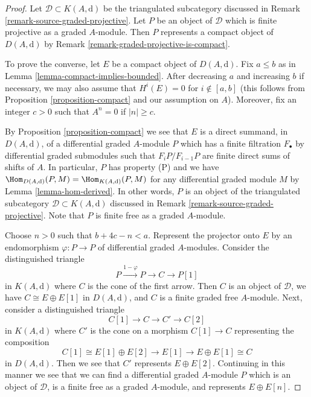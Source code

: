 \begin{proof}
Let $\mathcal{D} \subset K(A, \text{d})$ be the triangulated subcategory
discussed in Remark \ref{remark-source-graded-projective}.
Let $P$ be an object of $\mathcal{D}$ which is finite projective
as a graded $A$-module. Then $P$ represents a compact object of
$D(A, \text{d})$ by Remark \ref{remark-graded-projective-is-compact}.

\medskip\noindent
To prove the converse, let $E$ be a compact object of $D(A, \text{d})$.
Fix $a \leq b$ as in Lemma \ref{lemma-compact-implies-bounded}.
After decreasing $a$ and increasing $b$ if necessary, we may also
assume that $H^i(E) = 0$ for $i \not \in [a, b]$ (this follows
from Proposition \ref{proposition-compact} and our assumption on $A$).
Moreover, fix an integer $c > 0$ such that $A^n = 0$ if $|n| \geq c$.

\medskip\noindent
By Proposition \ref{proposition-compact} we see that $E$ is a direct
summand, in $D(A, \text{d})$, of a differential graded $A$-module $P$
which has a finite filtration $F_\bullet$ by differential
graded submodules such that $F_iP/F_{i - 1}P$ are finite direct sums
of shifts of $A$. In particular, $P$ has property (P) and we have
$\Hom_{D(A, \text{d})}(P, M) = \Hom_{K(A, \text{d})}(P, M)$ for any
differential graded module $M$ by Lemma \ref{lemma-hom-derived}.
In other words, $P$ is an object of the triangulated
subcategory $\mathcal{D} \subset K(A, \text{d})$ discussed in
Remark \ref{remark-source-graded-projective}.
Note that $P$ is finite free as a graded $A$-module.

\medskip\noindent
Choose $n > 0$ such that $b + 4c - n < a$.
Represent the projector onto $E$ by an endomorphism $\varphi : P \to P$ of
differential graded $A$-modules. Consider the distinguished triangle
$$
P \xrightarrow{1 - \varphi} P \to C \to P[1]
$$
in $K(A, \text{d})$ where $C$ is the cone of the first arrow. Then
$C$ is an object of $\mathcal{D}$,
we have $C \cong E \oplus E[1]$ in $D(A, \text{d})$, and
$C$ is a finite graded free $A$-module.
Next, consider a distinguished triangle
$$
C[1] \to C \to C' \to C[2]
$$
in $K(A, \text{d})$ where $C'$ is the cone on a morphism $C[1] \to C$
representing the composition
$$
C[1] \cong E[1] \oplus E[2] \to E[1] \to E \oplus E[1] \cong C
$$
in $D(A, \text{d})$. Then we see that $C'$ represents $E \oplus E[2]$.
Continuing in this manner we see that we can find a differential
graded $A$-module $P$ which is an object of $\mathcal{D}$,
is a finite free as a graded $A$-module, and represents $E \oplus E[n]$.


\end{proof}
